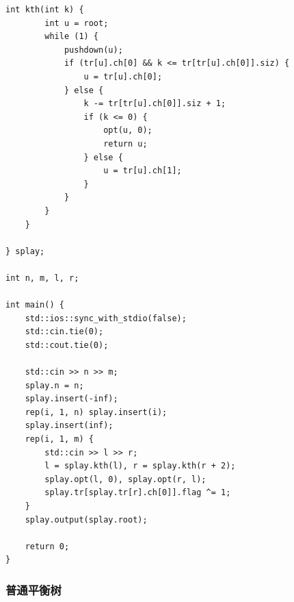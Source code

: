 \documentclass[UTF8, a4paper, titlepage, twoside]{ctexart}
\begin{document}
\begin{lstlisting}[style=cpp]
    int kth(int k) {
        int u = root;
        while (1) {
            pushdown(u);
            if (tr[u].ch[0] && k <= tr[tr[u].ch[0]].siz) {
                u = tr[u].ch[0];
            } else {
                k -= tr[tr[u].ch[0]].siz + 1;
                if (k <= 0) {
                    opt(u, 0);
                    return u;
                } else {
                    u = tr[u].ch[1];
                }
            }
        }
    }

} splay;

int n, m, l, r;

int main() {
    std::ios::sync_with_stdio(false);
    std::cin.tie(0);
    std::cout.tie(0);

    std::cin >> n >> m;
    splay.n = n;
    splay.insert(-inf);
    rep(i, 1, n) splay.insert(i);
    splay.insert(inf);
    rep(i, 1, m) {
        std::cin >> l >> r;
        l = splay.kth(l), r = splay.kth(r + 2);
        splay.opt(l, 0), splay.opt(r, l);
        splay.tr[splay.tr[r].ch[0]].flag ^= 1;
    }
    splay.output(splay.root);

    return 0;
}
\end{lstlisting}

\subsubsection*{ 普通平衡树 }
\end{document}
